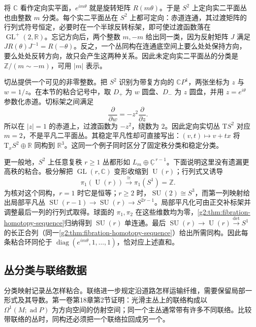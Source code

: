 将 \(\mathbb C\) 看作定向实平面，\(e^{im\theta}\) 就是旋转矩阵 \(R(m\theta)\)。于是 \(S^2\) 上定向实二平面丛也由整数 \(m\) 分类。每个实二平面丛在 \(S^2\) 上都可定向：赤道连通，其过渡矩阵的行列式符号恒定，必要时在一个半球反转标架，即可使过渡函数落在 \(\operatorname{GL}^+(2,\mathbb R)\)。忘记方向后，两个整数 \(m,-m\) 给出同一类，因为反射矩阵 \(J\) 满足 \(JR(\theta)J^{-1}=R(-\theta)\)。反之，一个丛同构在连通底空间上要么处处保持方向，要么处处反转方向，故只会产生这两种关系。因此未定向实二平面丛的分类是 \(\mathbb Z/(m\sim-m)\)，可用 \(|m|\) 表示。

\ProseParagraphBreak

切丛提供一个可见的非零整数。把 \(S^2\) 识别为带复方向的 \(\mathbb CP^1\)，两张坐标为 \(z\) 与 \(w=1/z\)。在本节的粘合记号中，取 \(D_+\) 为 \(w\) 圆盘、\(D_-\) 为 \(z\) 圆盘，并用 \(z=e^{i\theta}\) 参数化赤道。切标架之间满足
\[
	\frac\partial{\partial w}=-z^2\frac\partial{\partial z}.
\]
所以在 \(|z|=1\) 的赤道上，过渡函数为 \(-z^2\)，绕数为 \(2\)。因此定向实切丛 \(\mathrm TS^2\) 对应 \(m=2\)，不是平凡二平面丛。其稳定平凡性却可直接写出：\((v,t)\mapsto v+tx\) 将 \(\mathrm T_xS^2\oplus\mathbb R\) 同构到 \(\mathbb R^3\)。这同一个例子同时区分了固定秩分类和稳定分类。

\ProseParagraphBreak

更一般地，\(S^2\) 上任意复秩 \(r\ge1\) 丛都形如 \(L_m\oplus\underline{\mathbb C}^{\,r-1}\)。下面说明这里没有遗漏更高秩的粘合。极分解把 \(\operatorname{GL}(r,\mathbb C)\) 变形收缩到 \(\operatorname U(r)\)；行列式又诱导
\[
	\pi_1(\operatorname U(r))\xrightarrow{\ \cong\ }\pi_1(S^1)=\mathbb Z.
\]
为核对这个同构，\(r=1\) 时它是恒等；\(r\ge2\) 时，\(\operatorname{SU}(2)\cong S^3\)，而第一列映射给出局部平凡丛 \(\operatorname{SU}(r-1)\to\operatorname{SU}(r)\to S^{2r-1}\)。局部平凡化可由正交补标架并调整最后一列的行列式取得。球面的 \(\pi_1,\pi_2\) 在这些维数均为零，\cref{g2:thm:fibration-homotopy-sequence}归纳得到 \(\operatorname{SU}(r)\) 单连通。最后 \(\operatorname{SU}(r)\to\operatorname U(r)\xrightarrow{\det}S^1\) 的长正合列（同一\cref{g2:thm:fibration-homotopy-sequence}）给出所需同构。因此每条粘合环同伦于 \(\operatorname{diag}(e^{im\theta},1,\ldots,1)\)，恰对应上述直和。

\subsection{丛分类与联络数据}
\label{g2:subsec:1904:04}

分类映射记录丛怎样粘合。联络进一步规定沿道路怎样运输纤维，需要保留局部一形式及其导数。第一卷第18章第2节证明：光滑主丛上的联络构成以 \(\Omega^1(M;\operatorname{ad}P)\) 为方向空间的仿射空间；同一个主丛通常带有许多不同联络。比较带联络的丛时，同构还必须把一个联络拉回成另一个。

